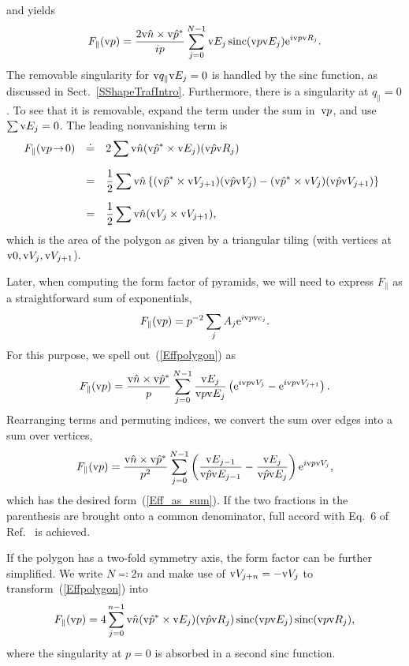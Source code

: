 and yields
\begin{equation}\label{Effpolygon}
    F_\parallel(\text{v}{p})
    = \frac{2\text{v}{\hat n}\times\text{v}{\hat p}^*}{ip} \sum_{j=0}^{N-1} \text{v}{E}_j \operatorname{sinc}(\text{v}{p}\text{v}{E}_j) \text{e}^{i\text{v}{p}\text{v}{R}_j}.
\end{equation}
The removable singularity for $\text{v}{q}_\parallel\text{v}{E}_j=0$
is handled by the sinc function, as discussed in Sect.~\ref{SShapeTrafIntro}.
Furthermore, there is a singularity at $q_\parallel=0$.
To see that it is removable,
expand the term under the sum in~$\text{v}{p}$,
and use $\sum\text{v}{E}_j=0$.
The leading nonvanishing term is
\begin{equation}
  \begin{array}{@{}lcl}
  F_\parallel(\qp\!\to\!0)
    &\doteq& \displaystyle 2\sum \n(\uqp^*\times\E_j) (\uqp\R_j)\\[3ex]
    &=&\displaystyle \frac{1}{2}\sum \n\left\{
        (\uqp^*\times\V_{j+1})(\uqp\V_j)
      - (\uqp^*\times\V_j)(\uqp\V_{j+1})
      \right\}\\[3ex]
    &=&\displaystyle \frac{1}{2}\sum \n(\V_j\times\V_{j+1}),
  \end{array}
\end{equation}
which is the area of the polygon
as given by a triangular tiling (with vertices at $\text{v}{0},\text{v}{V}_j,\text{v}{V}_{j+1}$).

Later, when computing the form factor of pyramids,
we will need to express $F_\parallel$ as a straightforward sum
of exponentials,
\begin{equation}\label{Eff_as_sum}
  F_\parallel(\text{v}{p})=p^{-2}\sum_j A_j \text{e}^{i\text{v}{p} \text{v}{c}_j}.
\end{equation}
For this purpose,
we spell out~(\ref{Effpolygon}) as
\begin{equation}
    F_\parallel(\text{v}{p})
    = \frac{\text{v}{\hat n}\times\text{v}{\hat p}^*}{p} \sum_{j=0}^{N-1} \frac{\text{v}{E}_j}{\text{v}{p}\text{v}{E}_j}
       \left(\text{e}^{i\text{v}{p}\text{v}{V}_j}-\text{e}^{i\text{v}{p}\text{v}{V}_{j+1}}\right).
\end{equation}
Rearranging terms and permuting indices,
we convert the sum over edges into a sum over vertices,
\begin{equation}\label{Effpolygon_expsum}
    F_\parallel(\text{v}{p})
    = \frac{\text{v}{\hat n}\times\text{v}{\hat p}^*}{p^2} \sum_{j=0}^{N-1}
       \left( \frac{\text{v}{E}_{j-1}}{\text{v}{\hat p}\text{v}{E}_{j-1}} - \frac{\text{v}{E}_j}{\text{v}{\hat p}\text{v}{E}_j} \right)
       \text{e}^{i\text{v}{p}\text{v}{V}_j},
\end{equation}
which has the desired form~(\ref{Eff_as_sum}).
If the two fractions in the parenthesis are brought onto a common denominator,
full accord with Eq.~6 of Ref.~\cite{LeMi83} is achieved.

If the polygon has a two-fold symmetry axis,
the form factor can be further simplified.
We write $N\eqqcolon2n$
and make use of $\text{v}{V}_{j+n}=-\text{v}{V}_j$ to transform~(\ref{Effpolygon}) into
\begin{equation}\label{Eff2ngon}
    F_\parallel(\text{v}{p}) = \displaystyle 4 \sum_{j=0}^{n-1}
              \text{v}{\hat n}(\text{v}{\hat p}^*\times\text{v}{E}_j) (\text{v}{\hat p}\text{v}{R}_j) \operatorname{sinc}(\text{v}{p}\text{v}{E}_j) \operatorname{sinc}(\text{v}{p}\text{v}{R}_j),
\end{equation}
where the singularity at $p=0$ is absorbed in a second sinc function.
%
%

